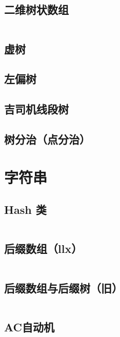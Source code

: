 \documentclass[10pt, a4paper, oneside]{ctexart}
\begin{document}
\begin{multicols}{2}
        \subsection{二维树状数组}
        \inputminted{cpp}{src/data structure/2D-BIT.cpp}
        \subsection{虚树}
        
        \subsection{左偏树}
        
        \subsection{吉司机线段树}
        
        \subsection{树分治（点分治）}
        
        \newpage

        
        \section{字符串}
        \subsection{Hash 类}
        \inputminted{cpp}{src/string/hash.cpp}
        \subsection{后缀数组（llx）}
        \inputminted{cpp}{src/string/llx_SA.cpp}
        \subsection{后缀数组与后缀树（旧）}
        \inputminted{cpp}{src/string/SA.cpp}
        \subsection{AC自动机}
        \inputminted{cpp}{src/string/ACAM.cpp}

\end{multicols}
\end{document}

